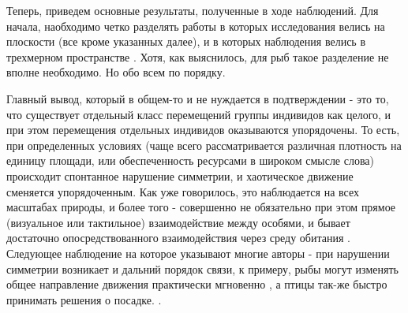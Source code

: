 	Теперь, приведем основные результаты, полученные в ходе наблюдений. Для начала, наобходимо четко разделять работы в которых исследования велись на плоскости (все кроме указанных далее), и в которых наблюдения велись в трехмерном пространстве \cite{cullen1965,ballerini2008,major1978,makris2009}. Хотя, как выяснилось, для рыб такое разделение не вполне необходимо. Но обо всем по порядку.

	Главный вывод, который в общем-то и не нуждается в подтверждении - это то, что существует отдельный класс перемещений группы индивидов как целого, и при этом перемещения отдельных индивидов оказываются упорядочены. То есть, при определенных условиях (чаще всего рассматривается различная плотность на единицу площади, или обеспеченность ресурсами в широком смысле слова) происходит спонтанное нарушение симметрии, и хаотическое движение сменяется упорядоченным. Как уже говорилось, это наблюдается на всех масштабах природы, и более того - совершенно не обязательно при этом прямое (визуальное или тактильное) взаимодействие между особями, и бывает достаточно опосредствованного взаимодействия через среду обитания \cite[с. 119]{vicsek2012}. %
	Следующее наблюдение на которое указывают многие авторы - при нарушении симметрии возникает и дальний порядок связи, к примеру, рыбы могут изменять общее направление движения практически мгновенно \cite{cambui2012}, а птицы так-же быстро принимать решения о посадке. \cite{lukeman2010,major1978}.

